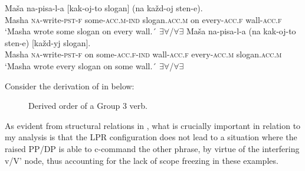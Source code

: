 \documentclass[output=paper,colorlinks,citecolor=brown,modfonts,nonflat]{langsci/langscibook}
\begin{document}
\ea%
    \label{ex:antonyuk:59}
    \ea \label{ex:antonyuk:59a}
    \gll    Maša na-pisa-l-a [kak-oj-to slogan] (na každ-oj sten-e).\\
            Masha \textsc{na-}write\textsc{-pst-f} \hspaceThis{[}some\textsc{-acc.m-ind} slogan\textsc{.acc.m} on every\textsc{-acc.f} wall\textsc{-acc.f}\\
    \glt    `Masha wrote some slogan on every wall.´ 
            \hfill ${\exists}{\forall}$/${\forall}{\exists}$
    \ex \label{ex:antonyuk:59b}
    \gll    Maša na-pisa-l-a (na kak-oj-to sten-e) [každ-yj slogan].\\
            Masha \textsc{na-}write\textsc{-pst-f} on some\textsc{-acc.f-ind} wall\textsc{-acc.f} \hspaceThis{[}every\textsc{-acc.m} slogan\textsc{.acc.m}\\
    \glt    `Masha wrote every slogan on some wall.´ 
            \hfill ${\exists}{\forall}$/${\forall}{\exists}$
    \z
\z

Consider the derivation of  in  below:

\begin{figure}
\caption{Derived order of a Group 3 verb.}
\label{fig:antonyuk:4}
\end{figure}

As evident from structural relations in , what is crucially important in relation to my analysis is that the LPR configuration does not lead to a situation where the raised PP/DP is able to c-command the other phrase, by virtue of the interfering v/V' node, thus accounting for the lack of scope freezing in these examples.
\end{document}
